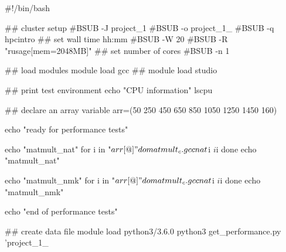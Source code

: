 #!/bin/bash

## cluster setup
#BSUB -J project_1
#BSUB -o project_1_%
#BSUB -q hpcintro
## set wall time hh:mm
#BSUB -W 20
#BSUB -R "rusage[mem=2048MB]"
## set number of cores
#BSUB -n 1


##  load modules
module load gcc
## module load studio

## print test environment
echo "CPU information"
lscpu

## declare an array variable
arr=(50 250 450 650 850 1050 1250 1450 160)

echo "\nnow ready for performance tests\n"

echo "\nstart matmult_nat\n"
for i in "${arr[@]}"
do
  matmult_c.gcc nat $i $i $i
done
echo "\nend matmult_nat\n"


echo "\nstart matmult_nmk\n"
for i in "${arr[@]}"
do
  matmult_c.gcc nat $i $i $i
done
echo "\nend matmult_nmk\n"



echo "\n end of performance tests\n"



## create data file
module load python3/3.6.0
python3 get_performance.py 'project_1_%